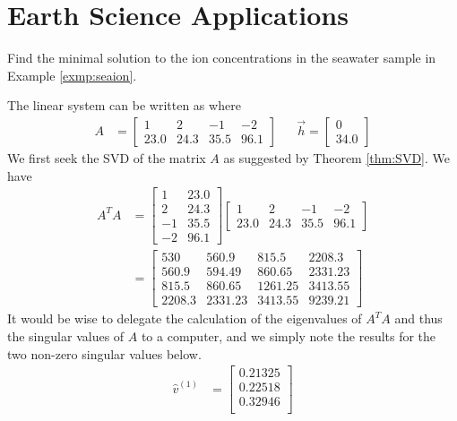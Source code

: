 \section{Earth Science Applications}

\begin{exmp}
Find the minimal solution to the ion concentrations in the seawater sample in Example \ref{exmp:seaion}.
\end{exmp}
\begin{solution}
The linear system can be written as  where
\begin{align*}
A &= 
\begin{bmatrix}
1 & 2 & -1 & -2 \\
23.0 & 24.3 & 35.5 & 96.1    
\end{bmatrix}
& & \vec{h} =
\begin{bmatrix}
0 \\
34.0
\end{bmatrix}
\end{align*}
We first seek the SVD of the matrix $A$ as suggested by Theorem \ref{thm:SVD}. We have
\begin{align*}
A^TA &=
\begin{bmatrix}
1 & 23.0 \\
2 & 24.3 \\
-1 & 35.5 \\
-2 & 96.1    
\end{bmatrix}
\begin{bmatrix}
1 & 2 & -1 & -2 \\
23.0 & 24.3 & 35.5 & 96.1    
\end{bmatrix} \\
&=
\begin{bmatrix}
530&560.9&815.5&2208.3\\ 
560.9&594.49&860.65&2331.23\\ 
815.5&860.65&1261.25&3413.55\\ 
2208.3&2331.23&3413.55&9239.21
\end{bmatrix}
\end{align*}
It would be wise to delegate the calculation of the eigenvalues of $A^TA$ and thus the singular values of $A$ to a computer, and we simply note the results for the two non-zero singular values below.
\begin{align*}
\hat{v}^{(1)} &= 
\begin{bmatrix}
0.21325 \\
0.22518 \\  
0.32946 \\

\end{bmatrix}
\end{align*}
\end{solution}
